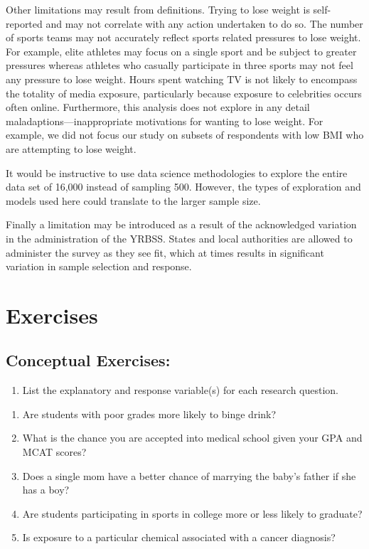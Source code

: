 \documentclass[
]{krantz}
\providecommand{\tightlist}{%
  \setlength{\itemsep}{0pt}\setlength{\parskip}{0pt}}
\begin{document}
Other limitations may result from definitions. Trying to lose weight is self-reported and may not correlate with any action undertaken to do so. The number of sports teams may not accurately reflect sports related pressures to lose weight. For example, elite athletes may focus on a single sport and be subject to greater pressures whereas athletes who casually participate in three sports may not feel any pressure to lose weight. Hours spent watching TV is not likely to encompass the totality of media exposure, particularly because exposure to celebrities occurs often online. Furthermore, this analysis does not explore in any detail maladaptions---inappropriate motivations for wanting to lose weight. For example, we did not focus our study on subsets of respondents with low BMI who are attempting to lose weight.

It would be instructive to use data science methodologies to explore the entire data set of 16,000 instead of sampling 500. However, the types of exploration and models used here could translate to the larger sample size.

Finally a limitation may be introduced as a result of the acknowledged variation in the administration of the YRBSS. States and local authorities are allowed to administer the survey as they see fit, which at times results in significant variation in sample selection and response.

\hypertarget{exercises-5}{%
\section{Exercises}\label{exercises-5}}

\hypertarget{conceptual-exercises-3}{%
\subsection{Conceptual Exercises:}\label{conceptual-exercises-3}}

\begin{enumerate}
\def\labelenumi{\arabic{enumi}.}
\tightlist
\item
  List the explanatory and response variable(s) for each research question.
\end{enumerate}

\begin{enumerate}
\def\labelenumi{\alph{enumi}.}
\tightlist
\item
  Are students with poor grades more likely to binge drink?
\item
  What is the chance you are accepted into medical school given your GPA and MCAT scores?
\item
  Does a single mom have a better chance of marrying the baby's father if she has a boy?
\item
  Are students participating in sports in college more or less likely to graduate?
\item
  Is exposure to a particular chemical associated with a cancer diagnosis?
\end{enumerate}
\end{document}
